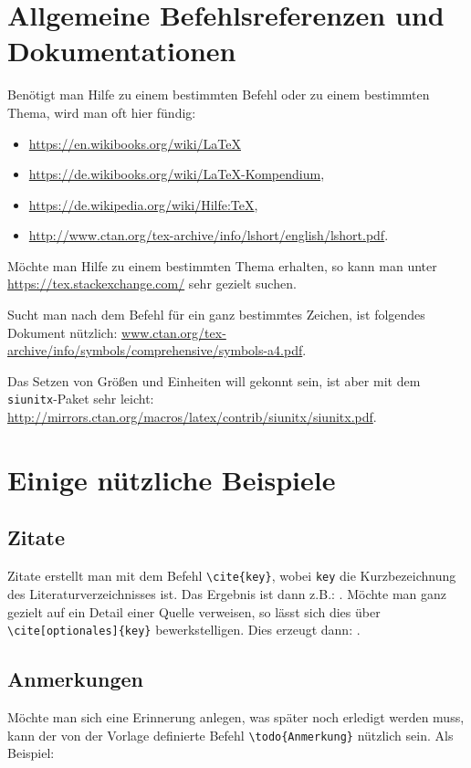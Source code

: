 \section{Allgemeine Befehlsreferenzen und Dokumentationen}
Benötigt man Hilfe zu einem bestimmten Befehl oder zu einem bestimmten Thema, wird man oft hier fündig:

\begin{itemize}
 \item \url{https://en.wikibooks.org/wiki/LaTeX}
 \item \url{https://de.wikibooks.org/wiki/LaTeX-Kompendium},
 \item \url{https://de.wikipedia.org/wiki/Hilfe:TeX},
 \item \url{http://www.ctan.org/tex-archive/info/lshort/english/lshort.pdf}.
\end{itemize}

Möchte man Hilfe zu einem bestimmten Thema erhalten, so kann man unter \url{https://tex.stackexchange.com/} sehr gezielt suchen.

Sucht man nach dem Befehl für ein ganz bestimmtes Zeichen, ist folgendes Dokument nützlich: \url{www.ctan.org/tex-archive/info/symbols/comprehensive/symbols-a4.pdf}.

Das Setzen von Größen und Einheiten will gekonnt sein, ist aber mit dem \verb|siunitx|-Paket sehr leicht: \url{http://mirrors.ctan.org/macros/latex/contrib/siunitx/siunitx.pdf}.

\section{Einige nützliche Beispiele}
\subsection{Zitate}
Zitate erstellt man mit dem Befehl \verb|\cite{key}|, wobei \verb|key| die Kurzbezeichnung des Literaturverzeichnisses ist. Das Ergebnis ist dann z.B.: \cite{EKS07}. Möchte man ganz gezielt auf ein Detail einer Quelle verweisen, so lässt sich dies über \verb|\cite[optionales]{key}| bewerkstelligen. Dies erzeugt dann: \cite[S. 42]{EKS07}.

\subsection{Anmerkungen}
Möchte man sich eine Erinnerung anlegen, was später noch erledigt werden muss, kann der von der Vorlage definierte Befehl \verb|\todo{Anmerkung}| nützlich sein. Als Beispiel:

